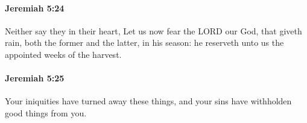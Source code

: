 		\paragraph{Jeremiah 5:24} %
			\label{JEREMIAH-5-24}

			Neither say they in their heart, Let us now fear the LORD our God, that giveth rain, both the former and the latter, in his season: he reserveth unto us the appointed weeks of the harvest.


		\paragraph{Jeremiah 5:25} %
			\label{JEREMIAH-5-25}

			Your iniquities have turned away these things, and your sins have withholden good things from you.


